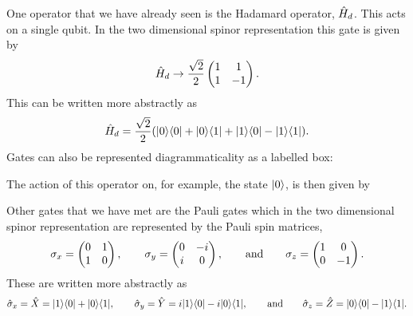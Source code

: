     One operator that we have already seen is the Hadamard operator, \(\hat{H}_d\).
    This acts on a single qubit.
    In the two dimensional spinor representation this gate is given by
    \[\hat{H}_d\mathrel{\rightarrow} \frac{\sqrt{2}}{2}\begin{pmatrix} {1} & {1}\\ {1} & {-1} \end{pmatrix}.\]
    This can be written more abstractly as
    \[\hat{H}_d = \frac{\sqrt{2}}{2}(\vert {0}\rangle\langle {0} \vert + \vert {0}\rangle\langle {1} \vert + \vert {1}\rangle\langle {0} \vert - \vert {1}\rangle\langle {1} \vert).\]
    Gates can also be represented diagrammaticality as a labelled box:
    \begin{center}
    \end{center}
    The action of this operator on, for example, the state \(\vert {0} \rangle\), is then given by
    \begin{center}
    \end{center}
    Other gates that we have met are the Pauli gates which in the two dimensional spinor representation are represented by the Pauli spin matrices,
    \[\sigma_x = \begin{pmatrix} {0} & {1}\\ {1} & {0} \end{pmatrix}, \qquad \sigma_y = \begin{pmatrix} {0} & {-i}\\ {i} & {0} \end{pmatrix}, \qquad\text{and}\qquad \sigma_z = \begin{pmatrix} {1} & {0}\\ {0} & {-1} \end{pmatrix}.\]
    These are written more abstractly as
    \[\hat{\sigma}_x = \hat{X} = \vert {1}\rangle\langle {0} \vert + \vert {0}\rangle\langle {1} \vert, \qquad \hat{\sigma}_y = \hat{Y} = i\vert {1}\rangle\langle {0} \vert - i\vert {0}\rangle\langle {1} \vert, \qquad\text{and}\qquad \hat{\sigma}_z = \hat{Z} = \vert {0}\rangle\langle {0} \vert - \vert {1}\rangle\langle {1} \vert.\]
